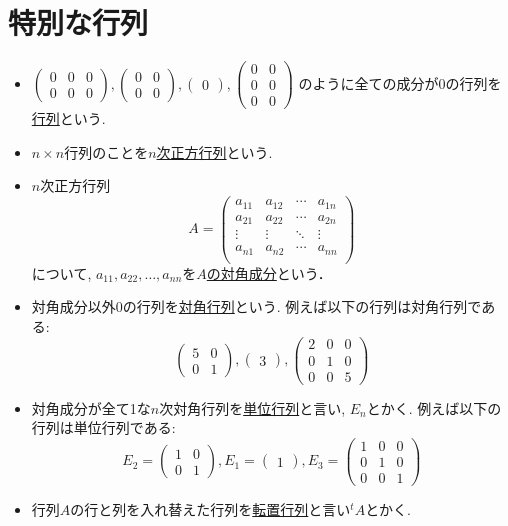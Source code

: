 \documentclass[dvipdfmx,a4paper,11pt]{article}
\theoremstyle{definition}
\begin{document}
\section{特別な行列}
\begin{itemize}
\item  $
 \begin{pmatrix}
0 &0&0\\
0 &0&0
 \end{pmatrix}, 
  \begin{pmatrix}
0 &0\\
0 &0
 \end{pmatrix}, 
   \begin{pmatrix}
0 
 \end{pmatrix}, 
   \begin{pmatrix}
0 &0\\
0 &0 \\
0&0
 \end{pmatrix}
 $
 のように全ての成分が0の行列を\underline{行列}という.
 \item $n \times n$行列のことを\underline{$n$次正方行列}という.
 \item $n$次正方行列
 $$
 A =
 \begin{pmatrix}
a_{11}& a_{12} & \cdots &a_{1n} \\
a_{21}& a_{22} & \cdots &a_{2n} \\
\vdots& \vdots	&	\ddots   &	\vdots \\
a_{n1}& a_{n2} & \cdots &a_{nn} \\
\end{pmatrix}
 $$
 について, $a_{11}, a_{22}, \ldots, a_{nn}$を\underline{$A$の対角成分}という．
 \item 対角成分以外0の行列を\underline{対角行列}という. 例えば以下の行列は対角行列である:
  $$
 \begin{pmatrix}
5&0\\
0 &1
 \end{pmatrix}, 
  \begin{pmatrix}
3
 \end{pmatrix}, 
   \begin{pmatrix}
2&0 &0\\
0 &1 &0\\
0&0&5
 \end{pmatrix}
 $$
 \item 対角成分が全て1な$n$次対角行列を\underline{単位行列}と言い, $E_n$とかく. 例えば以下の行列は単位行列である:
   $$
   E_2 =
 \begin{pmatrix}
1&0\\
0 &1
 \end{pmatrix}, 
 E_1=
  \begin{pmatrix}
1
 \end{pmatrix}, 
 E_3=
   \begin{pmatrix}
1&0 &0\\
0 &1 &0\\
0&0&1
 \end{pmatrix}
 $$
 \item 行列$A$の行と列を入れ替えた行列を\underline{転置行列}と言い${}^{t}A$とかく.
\end{itemize}
\end{document}
